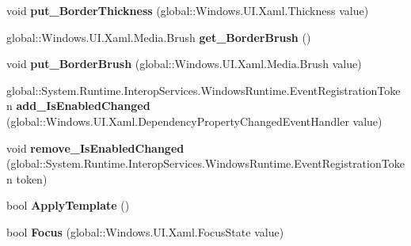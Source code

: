 \begin{DoxyCompactItemize}
void {\bfseries put\+\_\+\+Border\+Thickness} (global\+::\+Windows.\+U\+I.\+Xaml.\+Thickness value)
\item 
\mbox{\label{interface_windows_1_1_u_i_1_1_xaml_1_1_controls_1_1_i_control_a1abfbeb7516aaa3813e93972e9cd5675}} 
global\+::\+Windows.\+U\+I.\+Xaml.\+Media.\+Brush {\bfseries get\+\_\+\+Border\+Brush} ()
\item 
\mbox{\label{interface_windows_1_1_u_i_1_1_xaml_1_1_controls_1_1_i_control_a4c2d7d5305d305b773e5ad689a8890bd}} 
void {\bfseries put\+\_\+\+Border\+Brush} (global\+::\+Windows.\+U\+I.\+Xaml.\+Media.\+Brush value)
\item 
\mbox{\label{interface_windows_1_1_u_i_1_1_xaml_1_1_controls_1_1_i_control_a37411d40405261227231f8142b22f8e0}} 
global\+::\+System.\+Runtime.\+Interop\+Services.\+Windows\+Runtime.\+Event\+Registration\+Token {\bfseries add\+\_\+\+Is\+Enabled\+Changed} (global\+::\+Windows.\+U\+I.\+Xaml.\+Dependency\+Property\+Changed\+Event\+Handler value)
\item 
\mbox{\label{interface_windows_1_1_u_i_1_1_xaml_1_1_controls_1_1_i_control_a9536f630fb699b5e3696f745e6f1fd92}} 
void {\bfseries remove\+\_\+\+Is\+Enabled\+Changed} (global\+::\+System.\+Runtime.\+Interop\+Services.\+Windows\+Runtime.\+Event\+Registration\+Token token)
\item 
\mbox{\label{interface_windows_1_1_u_i_1_1_xaml_1_1_controls_1_1_i_control_a68feca69bd9c95b33c4636574e86d05d}} 
bool {\bfseries Apply\+Template} ()
\item 
\mbox{\label{interface_windows_1_1_u_i_1_1_xaml_1_1_controls_1_1_i_control_a7c98017d582493146cd685fc022b8bcb}} 
bool {\bfseries Focus} (global\+::\+Windows.\+U\+I.\+Xaml.\+Focus\+State value)
\item 
\mbox{\label{interface_windows_1_1_u_i_1_1_xaml_1_1_controls_1_1_i_control_a9388b2d1fe635f428cae07d67c0a8aaf}} 

\end{DoxyCompactItemize}
